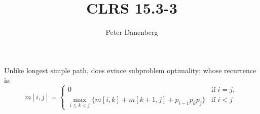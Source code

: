 \documentclass{article}
\title{CLRS 15.3-3}
\author{Peter Danenberg}
\begin{document}
\maketitle 

Unlike longest simple path,  does evince
subproblem optimality; whose recurrence is:
\[m[i,j]=
  \begin{cases}
    0 & \text{if $i=j$},\\
    \max_{i\leq k < j}\{m[i,k]+m[k+1,j]+p_{i-1}p_kp_j\}
      & \text{if $i < j$}
  \end{cases}
  \]
\end{document}
